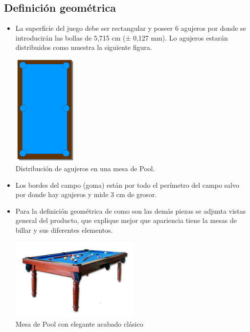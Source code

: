 	\subsection {Definición geométrica}
		    \begin{itemize}
		     \item La superficie del juego debe ser rectangular y poseer 6 agujeros por donde se introducirán las bollas de 5,715 cm (± 0,127 mm). Lo  agujeros estarán distribuidos como
			    muestra la siguiente figura.
		  \begin{center}
    			\includegraphics[width=0.25\textwidth]{billar.png} 
			\\ \small {Distribución de agujeros en una mesa de Pool.}
		\end{center}

		     \item Los bordes del campo (goma) están por todo el perímetro del campo salvo por donde hay agujeros y mide 3 cm de grosor.

		     \item Para la definición geométrica de como son las demás piezas  se adjunta vistas general del producto, que explique mejor que apariencia tiene la mesas de billar
			  y sus diferentes elementos. 
		\begin{center}
    			\includegraphics[width=0.5\textwidth]{donbillar.png}
     \\ \small {Mesa de Pool con elegante acabado clásico}
		\end{center}	
		    \end{itemize}
		    

